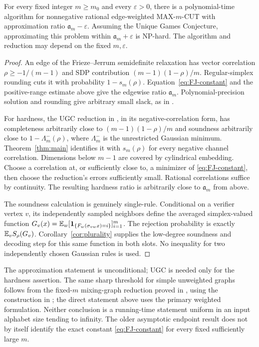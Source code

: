 \begin{corollary}
\label{cor:cut}
For every fixed integer $m\ge m_0$ and every $\varepsilon>0$, there is
a polynomial-time algorithm for nonnegative rational edge-weighted
MAX-$m$-CUT with approximation ratio $\mathfrak a_m-\varepsilon$.
Assuming the Unique Games Conjecture, approximating this problem
within $\mathfrak a_m+\varepsilon$ is NP-hard.
The algorithm and reduction may depend on the fixed $m,\varepsilon$.
\end{corollary}
\begin{proof}
An edge of the Frieze--Jerrum semidefinite relaxation has vector
correlation $\rho\ge-1/(m-1)$ and SDP contribution
$(m-1)(1-\rho)/m$. Regular-simplex rounding cuts it with probability
$1-s_m(\rho)$. Equation~\eqref{eq:FJ-constant} and the positive-range
estimate above give the edgewise ratio $\mathfrak a_m$.
Polynomial-precision solution and rounding give arbitrary small slack,
as in \cite[Appendix~A.3, Theorem~A.6]{IM}.

For hardness, the UGC reduction in \cite[Appendix~A.4]{IM}, in its
negative-correlation form, has completeness arbitrarily close to
$(m-1)(1-\rho)/m$ and soundness arbitrarily close to
$1-\Lambda_m^-(\rho)$, where $\Lambda_m^-$ is the unrestricted
Gaussian minimum. Theorem~\ref{thm:main} identifies it with
$s_m(\rho)$ for every negative channel correlation. Dimensions below
$m-1$ are covered by cylindrical embedding. Choose a correlation at,
or sufficiently close to, a minimizer of \eqref{eq:FJ-constant}, then
choose the reduction's errors sufficiently small. Rational correlations
suffice by continuity. The resulting hardness ratio is arbitrarily
close to $\mathfrak a_m$ from above.

The soundness calculation is genuinely single-rule. Conditional on a
verifier vertex $v$, its independently sampled neighbors define the
averaged simplex-valued function
$G_v(x)=\mathbb E_w[\mathbf 1_{\{F_w(\sigma_{vw}x)=i\}}]_{i=1}^m$.
The rejection probability is exactly $\mathbb E_v S_\rho(G_v)$.
Corollary~\ref{cor:plurality} supplies the low-degree soundness and
decoding step for this same function in both slots. No inequality for
two independently chosen Gaussian rules is used.
\end{proof}

The approximation statement is unconditional; UGC is needed only for
the hardness assertion. The same sharp threshold for simple unweighted
graphs follows from the fixed-$m$ mixing-graph reduction proved in
\cite[Section~4]{transfer}, using the construction in
\cite[Theorem~13]{CST}; the direct statement above uses the primary
weighted formulation. Neither conclusion is a running-time statement
uniform in an input alphabet size tending to infinity. The older
asymptotic endpoint result \cite[Proposition~11.4]{KKMO} does not by
itself identify the exact constant \eqref{eq:FJ-constant} for every
fixed sufficiently large $m$.
